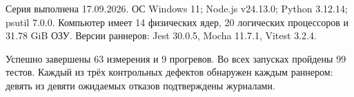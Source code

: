 Серия выполнена 17.09.2026. ОС Windows 11; Node.js v24.13.0; Python 3.12.14; psutil 7.0.0. Компьютер имеет 14 физических ядер, 20 логических процессоров и 31.78 GiB ОЗУ. Версии раннеров: Jest 30.0.5, Mocha 11.7.1, Vitest 3.2.4.

Успешно завершены 63 измерения и 9 прогревов. Во всех запусках пройдены 99 тестов. Каждый из трёх контрольных дефектов обнаружен каждым раннером: девять из девяти ожидаемых отказов подтверждены журналами.
